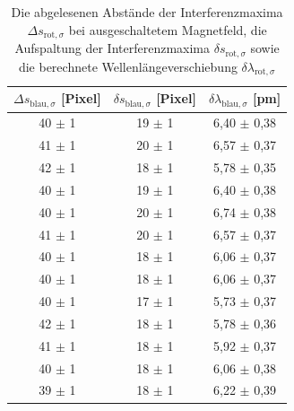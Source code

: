               \begin{table}[h]
                \centering
                \caption{Die abgelesenen Abstände der Interferenzmaxima $\Delta s_{\text{rot}, \sigma}$ bei ausgeschaltetem Magnetfeld, die Aufspaltung der Interferenzmaxima $\delta s_{\text{rot}, \sigma}$ sowie die berechnete Wellenlängeverschiebung $\delta \lambda_{\text{rot}, \sigma}$}
                \label{tab:blau_sigma}
              
                \begin{tabular}{c c c}
                  \toprule
                  {$\Delta s_{\text{blau}, \sigma}$ [Pixel]} & {$\delta s_{\text{blau}, \sigma}$ [Pixel]} & {$\delta \lambda_{\text{blau}, \sigma}$ [\si{\pico\metre}]} \\ 
                  \midrule
                   40 $\pm$ 1  &   19 $\pm$ 1   &   6,40 $\pm$ 0,38   \\
                   41 $\pm$ 1  &   20 $\pm$ 1   &   6,57 $\pm$ 0,37   \\
                   42 $\pm$ 1  &   18 $\pm$ 1   &   5,78 $\pm$ 0,35   \\
                   40 $\pm$ 1  &   19 $\pm$ 1   &   6,40 $\pm$ 0,38   \\
                   40 $\pm$ 1  &   20 $\pm$ 1   &   6,74 $\pm$ 0,38   \\
                   41 $\pm$ 1  &   20 $\pm$ 1   &   6,57 $\pm$ 0,37   \\
                   40 $\pm$ 1  &   18 $\pm$ 1   &   6,06 $\pm$ 0,37   \\
                   40 $\pm$ 1  &   18 $\pm$ 1   &   6,06 $\pm$ 0,37   \\
                   40 $\pm$ 1  &   17 $\pm$ 1   &   5,73 $\pm$ 0,37   \\
                   42 $\pm$ 1  &   18 $\pm$ 1   &   5,78 $\pm$ 0,36   \\
                   41 $\pm$ 1  &   18 $\pm$ 1   &   5,92 $\pm$ 0,37   \\
                   40 $\pm$ 1  &   18 $\pm$ 1   &   6,06 $\pm$ 0,38   \\
                   39 $\pm$ 1  &   18 $\pm$ 1   &   6,22 $\pm$ 0,39   \\

                  \bottomrule
                \end{tabular}
              \end{table}
              \FloatBarrier
            
            